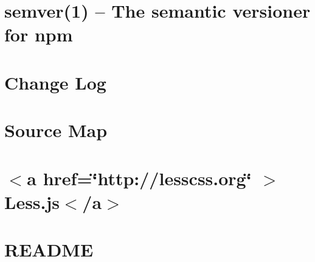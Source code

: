 \documentclass[twoside]{book}
\newcommand{\+}{\discretionary{\mbox{\scriptsize$\hookleftarrow$}}{}{}}
\begin{document}
\chapter{semver(1) -- The semantic versioner for npm}
\label{md__c___users_vaishnavi_jadhav__desktop__developer_code_mean_stack_example_client_node_modules_l430bc81df1fa17c13636f560e287a682}

\chapter{Change Log}
\label{md__c___users_vaishnavi_jadhav__desktop__developer_code_mean_stack_example_client_node_modules_ldbfb4382c5e46548c7604d13e902080f}

\chapter{Source Map}
\label{md__c___users_vaishnavi_jadhav__desktop__developer_code_mean_stack_example_client_node_modules_l714025b4df134113a009aeaa341e6d8e}

\chapter{\texorpdfstring{$<$}{<}a href=\char`\"{}http\+://lesscss.\+org\char`\"{} \texorpdfstring{$>$}{>}Less.\+js\texorpdfstring{$<$}{<}/a\texorpdfstring{$>$}{>}}
\label{md__c___users_vaishnavi_jadhav__desktop__developer_code_mean_stack_example_client_node_modules_less__r_e_a_d_m_e}

\chapter{README}
\label{md__c___users_vaishnavi_jadhav__desktop__developer_code_mean_stack_example_client_node_modules_less_test__r_e_a_d_m_e}

\end{document}
